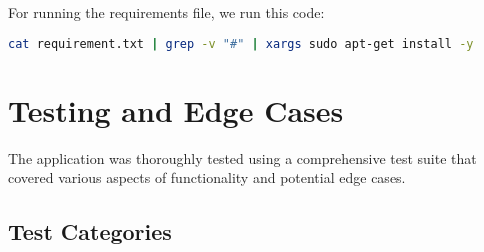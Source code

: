 \documentclass{article}
\begin{document}

For running the requirements file, we run this code:
\begin{lstlisting}[language=bash]
cat requirement.txt | grep -v "#" | xargs sudo apt-get install -y
\end{lstlisting}

\section{Testing and Edge Cases}
The application was thoroughly tested using a comprehensive test suite that covered various aspects of functionality and potential edge cases.

\subsection{Test Categories}
\end{document}
